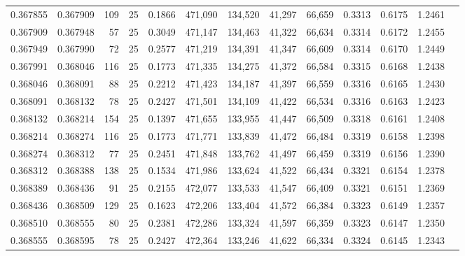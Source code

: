 \begin{tabular}{rrrrrrrrrrrrr}
0.367855 & 0.367909 &   109 &  25 &                                     0.1866 & 471,090 & 134,520 &  41,297 &  66,659 & 0.3313 & 0.6175 & 1.2461 \\
0.367909 & 0.367948 &    57 &  25 &                                     0.3049 & 471,147 & 134,463 &  41,322 &  66,634 & 0.3314 & 0.6172 & 1.2455 \\
0.367949 & 0.367990 &    72 &  25 &                                     0.2577 & 471,219 & 134,391 &  41,347 &  66,609 & 0.3314 & 0.6170 & 1.2449 \\
0.367991 & 0.368046 &   116 &  25 &                                     0.1773 & 471,335 & 134,275 &  41,372 &  66,584 & 0.3315 & 0.6168 & 1.2438 \\
0.368046 & 0.368091 &    88 &  25 &                                     0.2212 & 471,423 & 134,187 &  41,397 &  66,559 & 0.3316 & 0.6165 & 1.2430 \\
0.368091 & 0.368132 &    78 &  25 &                                     0.2427 & 471,501 & 134,109 &  41,422 &  66,534 & 0.3316 & 0.6163 & 1.2423 \\
0.368132 & 0.368214 &   154 &  25 &                                     0.1397 & 471,655 & 133,955 &  41,447 &  66,509 & 0.3318 & 0.6161 & 1.2408 \\
0.368214 & 0.368274 &   116 &  25 &                                     0.1773 & 471,771 & 133,839 &  41,472 &  66,484 & 0.3319 & 0.6158 & 1.2398 \\
0.368274 & 0.368312 &    77 &  25 &                                     0.2451 & 471,848 & 133,762 &  41,497 &  66,459 & 0.3319 & 0.6156 & 1.2390 \\
0.368312 & 0.368388 &   138 &  25 &                                     0.1534 & 471,986 & 133,624 &  41,522 &  66,434 & 0.3321 & 0.6154 & 1.2378 \\
0.368389 & 0.368436 &    91 &  25 &                                     0.2155 & 472,077 & 133,533 &  41,547 &  66,409 & 0.3321 & 0.6151 & 1.2369 \\
0.368436 & 0.368509 &   129 &  25 &                                     0.1623 & 472,206 & 133,404 &  41,572 &  66,384 & 0.3323 & 0.6149 & 1.2357 \\
0.368510 & 0.368555 &    80 &  25 &                                     0.2381 & 472,286 & 133,324 &  41,597 &  66,359 & 0.3323 & 0.6147 & 1.2350 \\
0.368555 & 0.368595 &    78 &  25 &                                     0.2427 & 472,364 & 133,246 &  41,622 &  66,334 & 0.3324 & 0.6145 & 1.2343 \\

\end{tabular}
